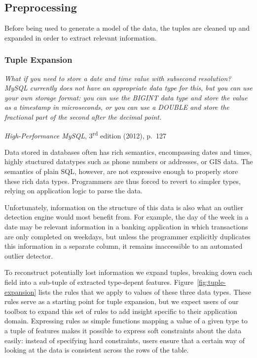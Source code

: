 \subsection{Preprocessing}
\label{sec:preprocessing}

Before being used to generate a model of the data, the tuples are cleaned up and expanded in order to extract relevant information.

\subsubsection{Tuple Expansion}

\noindent\begin{minipage}{0.8\linewidth}
  \itshape
  What if you need to store a date and time value with subsecond resolution? MySQL
  currently does not have an appropriate data type for this, but you can use your own
  storage format: you can use the BIGINT data type and store the value as a timestamp in
  microseconds, or you can use a DOUBLE and store the fractional part of the second after
  the decimal point.
\end{minipage}
\begin{flushright}
  \textit{High-Performance MySQL}, 3\textsuperscript{rd} edition (2012), p.~127
\end{flushright}

Data stored in databases often has rich semantics, encompassing dates and times, highly stuctured datatypes such as phone numbers or addresses, or GIS data. The semantics of plain SQL, however, are not expressive enough to properly store these rich data types. Programmers are thus forced to revert to simpler types, relying on application logic to parse the data.

Unfortunately, information on the structure of this data is also what an outlier detection engine would most benefit from. For example, the day of the week in a date may be relevant information in a banking application in which transactions are only completed on weekdays, but unless the programmer explicitly duplicates this information in a separate column, it remains inaccessible to an automated outlier detector.

To reconstruct potentially lost information we expand tuples, breaking down each field into a sub-tuple of extracted type-depent features. Figure~\ref{fig:tuple-expansion} lists the rules that we apply to values of these three data types. These rules serve as a starting point for tuple expansion, but we expect users of our toolbox to expand this set of rules to add insight specific to their application domain. Expressing rules as simple functions mapping a value of a given type to a tuple of features makes it possible to express soft constraints about the data easily: instead of specifying hard constraints, users ensure that a certain way of looking at the data is consistent across the rows of the table.

